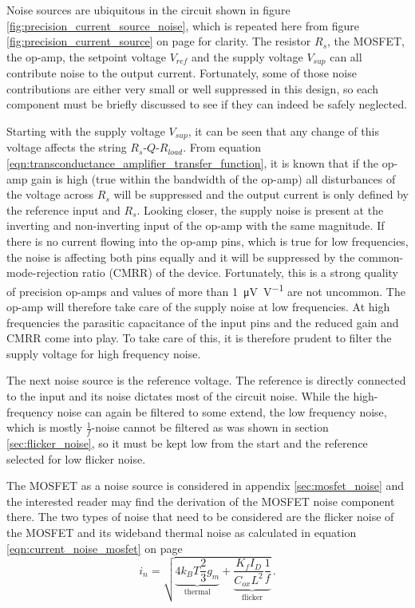 Noise sources are ubiquitous in the circuit shown in figure \ref{fig:precision_current_source_noise}, which is repeated here from figure \ref{fig:precision_current_source} on page \pageref{fig:precision_current_source} for clarity. The resistor $R_s$, the MOSFET, the op-amp, the setpoint voltage $V_{ref}$ and the supply voltage $V_{sup}$ can all contribute noise to the output current. Fortunately, some of those noise contributions are either very small or well suppressed in this design, so each component must be briefly discussed to see if they can indeed be safely neglected.

Starting with the supply voltage $V_{sup}$, it can be seen that any change of this voltage affects the string $R_s$-$Q$-$R_{load}$. From equation \ref{eqn:transconductance_amplifier_transfer_function}, it is known that if the op-amp gain is high (true within the bandwidth of the op-amp) all disturbances of the voltage across $R_s$ will be suppressed and the output current is only defined by the reference input and $R_s$. Looking closer, the supply noise is present at the inverting and non-inverting input of the op-amp with the same magnitude. If there is no current flowing into the op-amp pins, which is true for low frequencies, the noise is affecting both pins equally and it will be suppressed by the common-mode-rejection ratio (CMRR) of the device. Fortunately, this is a strong quality of precision op-amps and values of more than \qty[per-mode=power]{1}{\uV \per \volt} are not uncommon. The op-amp will therefore take care of the supply noise at low frequencies. At high frequencies the parasitic capacitance of the input pins and the reduced gain and CMRR come into play. To take care of this, it is therefore prudent to filter the supply voltage for high frequency noise.

The next noise source is the reference voltage. The reference is directly connected to the input and its noise dictates most of the circuit noise. While the high-frequency noise can again be filtered to some extend, the low frequency noise, which is mostly $\frac{1}{f}$-noise cannot be filtered as was shown in section \ref{sec:flicker_noise}, so it must be kept low from the start and the reference selected for low flicker noise.

The MOSFET as a noise source is considered in appendix \ref{sec:mosfet_noise} and the interested reader may find the derivation of the MOSFET noise component there. The two types of noise that need to be considered are the flicker noise of the MOSFET and its wideband thermal noise as calculated in equation \ref{eqn:current_noise_mosfet} on page \pageref{eqn:current_noise_mosfet}
\begin{equation*}
    i_{n} = \sqrt{\underbrace{4 k_B T \frac{2}{3} g_m}_{\text{thermal}} + \underbrace{\frac{K_f I_D}{C_{ox} L^2} \frac{1}{f}}_{\text{flicker}}} \,.
\end{equation*}

